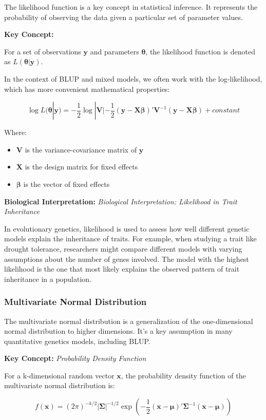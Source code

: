 \documentclass[12pt,a4paper]{article}
\newenvironment{keyconceptbox}[1][]
{\begin{basebox}[linecolor=uqblue]
\textbf{\color{uqblue}Key Concept:} \textit{#1}\par\noindent\ignorespaces}
{\end{basebox}}
\newenvironment{interpretation}[1][]
{\begin{basebox}[linecolor=uqgreen]
\textbf{\color{uqgreen}Biological Interpretation:} \textit{#1}\par\noindent\ignorespaces}
{\end{basebox}}
\begin{document}
The likelihood function is a key concept in statistical inference. It represents the probability of observing the data given a particular set of parameter values.

\begin{keyconceptbox}
For a set of observations $\mathbf{y}$ and parameters $\boldsymbol{\theta}$, the likelihood function is denoted as $L(\boldsymbol{\theta}|\mathbf{y})$.
\end{keyconceptbox}

In the context of BLUP and mixed models, we often work with the log-likelihood, which has more convenient mathematical properties:

$$\log L(\boldsymbol{\theta}|\mathbf{y}) = -\frac{1}{2} \log |\mathbf{V}| - \frac{1}{2} (\mathbf{y} - \mathbf{X\beta})' \mathbf{V}^{-1} (\mathbf{y} - \mathbf{X\beta}) + constant$$

Where:
\begin{itemize}
    \item $\mathbf{V}$ is the variance-covariance matrix of $\mathbf{y}$
    \item $\mathbf{X}$ is the design matrix for fixed effects
    \item $\boldsymbol{\beta}$ is the vector of fixed effects
\end{itemize}

\begin{interpretation}[Biological Interpretation: Likelihood in Trait Inheritance]
In evolutionary genetics, likelihood is used to assess how well different genetic models explain the inheritance of traits. For example, when studying a trait like drought tolerance, researchers might compare different models with varying assumptions about the number of genes involved. The model with the highest likelihood is the one that most likely explains the observed pattern of trait inheritance in a population.
\end{interpretation}

\subsubsection{Multivariate Normal Distribution}

The multivariate normal distribution is a generalization of the one-dimensional normal distribution to higher dimensions. It's a key assumption in many quantitative genetics models, including BLUP.

\begin{keyconceptbox}[Probability Density Function]
For a k-dimensional random vector $\mathbf{x}$, the probability density function of the multivariate normal distribution is:

\[
f(\mathbf{x}) = (2\pi)^{-k/2} |\boldsymbol{\Sigma}|^{-1/2} \exp\left(-\frac{1}{2} (\mathbf{x} - \boldsymbol{\mu})' \boldsymbol{\Sigma}^{-1} (\mathbf{x} - \boldsymbol{\mu})\right)
\]
\end{keyconceptbox}
\end{document}
